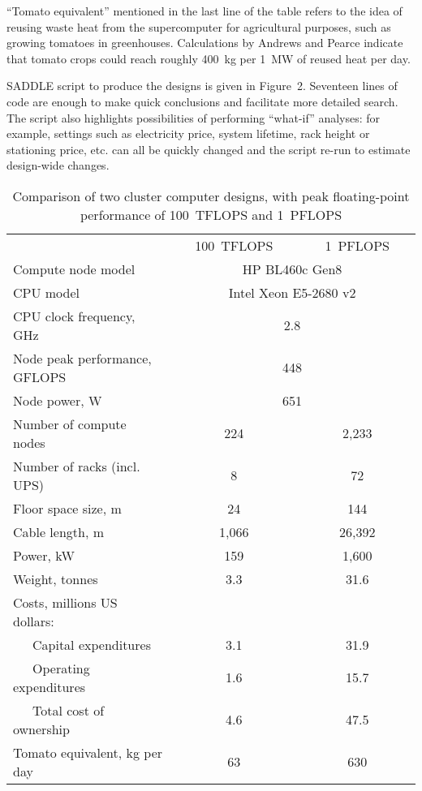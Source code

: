 \documentclass[runningheads,a4paper]{llncs}
\begin{document}
``Tomato equivalent'' mentioned in the last line of the table refers to the idea of reusing waste heat from the supercomputer for agricultural purposes, such as growing tomatoes in greenhouses. Calculations by Andrews and Pearce \cite{andrews2011environmental} indicate that tomato crops could reach roughly 400~kg per 1~MW of reused heat per day.

SADDLE script to produce the designs is given in Figure~2. Seventeen lines of code are enough to make quick conclusions and facilitate more detailed search. The script also highlights possibilities of performing ``what-if'' analyses: for example, settings such as electricity price, system lifetime, rack height or stationing price, etc. can all be quickly changed and the script re-run to estimate design-wide changes.

\begin{table}
\centering
\label{two-designs-table}
\caption{Comparison of two cluster computer designs, with peak floating-point performance of 100~TFLOPS and 1~PFLOPS}
\begin{tabular}{ l c c }
\hline\noalign{\smallskip}
& ~~~100~TFLOPS~~~ & ~~~1~PFLOPS~~~ \\
\noalign{\smallskip}
\hline
\noalign{\smallskip}
Compute node model & \multicolumn{2}{c}{ HP BL460c Gen8 } \\
CPU model & \multicolumn{2}{c}{ Intel Xeon E5-2680 v2 } \\
CPU clock frequency, GHz & \multicolumn{2}{c}{ 2.8 } \\
Node peak performance, GFLOPS & \multicolumn{2}{c}{ 448 } \\
Node power, W & \multicolumn{2}{c}{ 651 } \\
\noalign{\smallskip}
\hline
\noalign{\smallskip}
Number of compute nodes & 224 & 2,233 \\
Number of racks (incl. UPS) & 8 & 72 \\
Floor space size, m & 24 & 144 \\
Cable length, m & 1,066 & 26,392 \\
Power, kW & 159 & 1,600 \\
Weight, tonnes & 3.3 & 31.6 \\
Costs, millions US dollars: & \multicolumn{2}{c}{ ~ } \\
~~~Capital expenditures & 3.1 & 31.9 \\
~~~Operating expenditures & 1.6 & 15.7 \\
~~~Total cost of ownership & 4.6 & 47.5 \\
Tomato equivalent, kg per day & 63 & 630 \\
\hline
\end{tabular}
\end{table}
\end{document}
